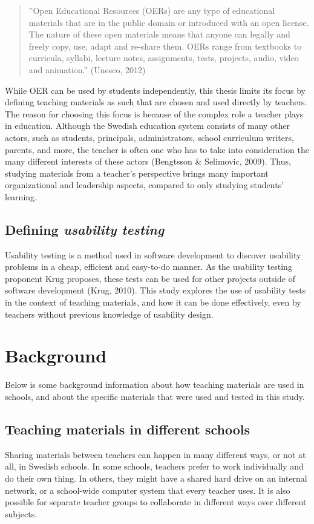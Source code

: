 \begin{quote}
''Open Educational Resources (OERs) are any type of educational materials that are in
the public domain or introduced with an open license. The nature of these open
materials means that anyone can legally and freely copy, use, adapt and re-share them.
OERs range from textbooks to curricula, syllabi, lecture notes, assignments, tests,
projects, audio, video and animation.'' (Unesco, 2012)
\end{quote}

While OER can be used by students independently, this thesis limits its focus by defining teaching materials as such that are chosen and used directly by teachers. The reason for choosing this focus is because of the complex role a teacher plays in education. Although the Swedish education system consists of many other actors, such as students, principals, administrators, school curriculum writers, parents, and more, the teacher is often one who has to take into consideration the many different interests of these actors (Bengtsson \& Selimovic, 2009). Thus, studying materials from a teacher's perspective brings many important organizational and leadership aspects, compared to only studying students' learning.

\subsection{Defining \textit{usability testing}}
Usability testing is a method used in software development to discover usability problems in a cheap, efficient and easy-to-do manner. As the usability testing proponent Krug proposes, these tests can be used for other projects outside of software development (Krug, 2010). This study explores the use of usability tests in the context of teaching materials, and how it can be done effectively, even by teachers without previous knowledge of usability design.

\section{Background}
Below is some background information about how teaching materials are used in schools, and about the specific materials that were used and tested in this study.

\subsection{Teaching materials in different schools}
Sharing materials between teachers can happen in many different ways, or not at all, in Swedish schools. In some schools, teachers prefer to work individually and do their own thing. In others, they might have a shared hard drive on an internal network, or a school-wide computer system that every teacher uses. It is also possible for separate teacher groups to collaborate in different ways over different subjects.

